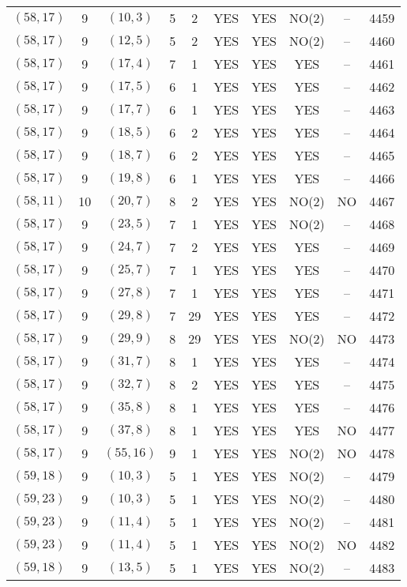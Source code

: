 \begin{longtable}{|c|c|c|c|c|c|c|c|c|c|}
$(58, 17)$ & 9 & $(10, 3)$ & 5 & 2 & YES & YES & NO(2) & -- & 4459\\
$(58, 17)$ & 9 & $(12, 5)$ & 5 & 2 & YES & YES & NO(2) & -- & 4460\\
$(58, 17)$ & 9 & $(17, 4)$ & 7 & 1 & YES & YES & YES & -- & 4461\\
$(58, 17)$ & 9 & $(17, 5)$ & 6 & 1 & YES & YES & YES & -- & 4462\\
$(58, 17)$ & 9 & $(17, 7)$ & 6 & 1 & YES & YES & YES & -- & 4463\\
$(58, 17)$ & 9 & $(18, 5)$ & 6 & 2 & YES & YES & YES & -- & 4464\\
$(58, 17)$ & 9 & $(18, 7)$ & 6 & 2 & YES & YES & YES & -- & 4465\\
$(58, 17)$ & 9 & $(19, 8)$ & 6 & 1 & YES & YES & YES & -- & 4466\\
$(58, 11)$ & 10 & $(20, 7)$ & 8 & 2 & YES & YES & NO(2) & NO & 4467\\
$(58, 17)$ & 9 & $(23, 5)$ & 7 & 1 & YES & YES & NO(2) & -- & 4468\\
$(58, 17)$ & 9 & $(24, 7)$ & 7 & 2 & YES & YES & YES & -- & 4469\\
$(58, 17)$ & 9 & $(25, 7)$ & 7 & 1 & YES & YES & YES & -- & 4470\\
$(58, 17)$ & 9 & $(27, 8)$ & 7 & 1 & YES & YES & YES & -- & 4471\\
$(58, 17)$ & 9 & $(29, 8)$ & 7 & 29 & YES & YES & YES & -- & 4472\\
$(58, 17)$ & 9 & $(29, 9)$ & 8 & 29 & YES & YES & NO(2) & NO & 4473\\
$(58, 17)$ & 9 & $(31, 7)$ & 8 & 1 & YES & YES & YES & -- & 4474\\
$(58, 17)$ & 9 & $(32, 7)$ & 8 & 2 & YES & YES & YES & -- & 4475\\
$(58, 17)$ & 9 & $(35, 8)$ & 8 & 1 & YES & YES & YES & -- & 4476\\
$(58, 17)$ & 9 & $(37, 8)$ & 8 & 1 & YES & YES & YES & NO & 4477\\
$(58, 17)$ & 9 & $(55, 16)$ & 9 & 1 & YES & YES & NO(2) & NO & 4478\\
$(59, 18)$ & 9 & $(10, 3)$ & 5 & 1 & YES & YES & NO(2) & -- & 4479\\
$(59, 23)$ & 9 & $(10, 3)$ & 5 & 1 & YES & YES & NO(2) & -- & 4480\\
$(59, 23)$ & 9 & $(11, 4)$ & 5 & 1 & YES & YES & NO(2) & -- & 4481\\
$(59, 23)$ & 9 & $(11, 4)$ & 5 & 1 & YES & YES & NO(2) & NO & 4482\\
$(59, 18)$ & 9 & $(13, 5)$ & 5 & 1 & YES & YES & NO(2) & -- & 4483\\

\end{longtable}
